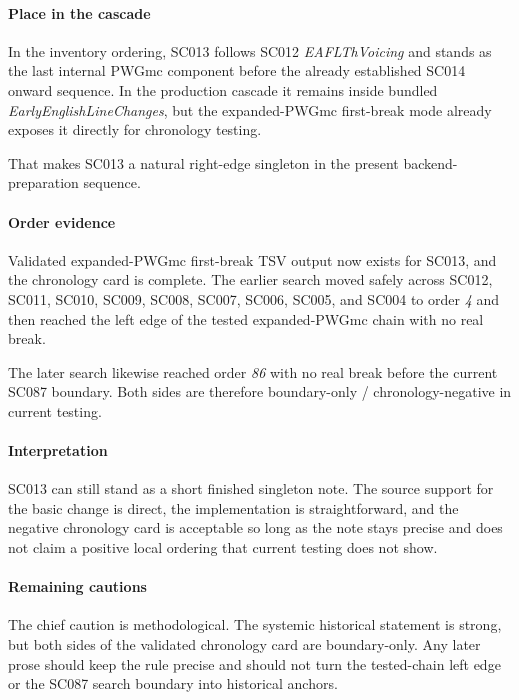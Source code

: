\documentclass[
  british,
  a4paper,
]{article}
\begin{document}
\paragraph{Place in the cascade}\label{place-in-the-cascade-10}

In the inventory ordering, SC013 follows SC012 \emph{EAFLThVoicing} and
stands as the last internal PWGmc component before the already
established SC014 onward sequence. In the production cascade it remains
inside bundled \emph{EarlyEnglishLineChanges}, but the expanded-PWGmc
first-break mode already exposes it directly for chronology testing.

That makes SC013 a natural right-edge singleton in the present
backend-preparation sequence.

\paragraph{Order evidence}\label{order-evidence-10}

Validated expanded-PWGmc first-break TSV output now exists for SC013,
and the chronology card is complete. The earlier search moved safely
across SC012, SC011, SC010, SC009, SC008, SC007, SC006, SC005, and SC004
to order \emph{4} and then reached the left edge of the tested
expanded-PWGmc chain with no real break.

The later search likewise reached order \emph{86} with no real break
before the current SC087 boundary. Both sides are therefore
boundary-only / chronology-negative in current testing.

\paragraph{Interpretation}\label{interpretation-10}

SC013 can still stand as a short finished singleton note. The source
support for the basic change is direct, the implementation is
straightforward, and the negative chronology card is acceptable so long
as the note stays precise and does not claim a positive local ordering
that current testing does not show.

\paragraph{Remaining cautions}\label{remaining-cautions-10}

The chief caution is methodological. The systemic historical statement
is strong, but both sides of the validated chronology card are
boundary-only. Any later prose should keep the rule precise and should
not turn the tested-chain left edge or the SC087 search boundary into
historical anchors.
\end{document}
